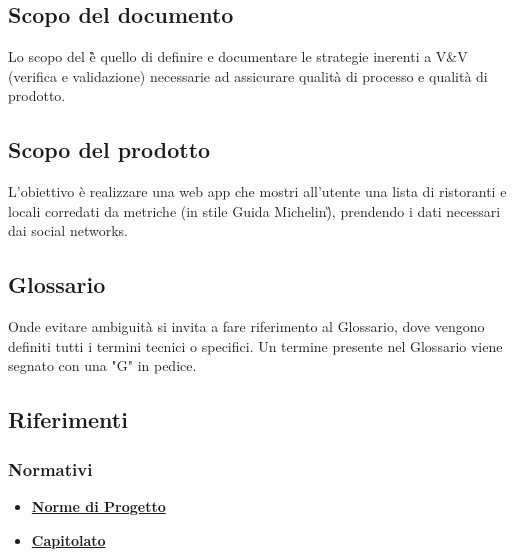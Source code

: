 \subsection{Scopo del documento}
Lo scopo del \PdQ{}\G è quello di definire e documentare le strategie inerenti a V\&V (verifica
e validazione) necessarie ad assicurare qualità di processo e qualità di prodotto.

\subsection{Scopo del prodotto}
L'obiettivo è realizzare una web app che mostri all'utente una lista di ristoranti e locali 
corredati da metriche (in stile Guida Michelin\G), prendendo i dati necessari dai social networks.

\subsection{Glossario}
Onde evitare ambiguità si invita a fare riferimento al Glossario, dove vengono definiti tutti 
i termini tecnici o specifici. Un termine presente nel Glossario viene segnato con una "G" in pedice.

\subsection{Riferimenti}
\subsubsection{Normativi}
\begin{itemize}
    \item \href{https://github.com/Bug-s-Bunny-Team/docs/tree/master/src/Interni/Norme_Di_Progetto}{\textbf{Norme di Progetto}}
    \item \href{https://www.math.unipd.it/~tullio/IS-1/2021/Progetto/C4p.pdf}{\textbf{Capitolato}}
\end{itemize}

